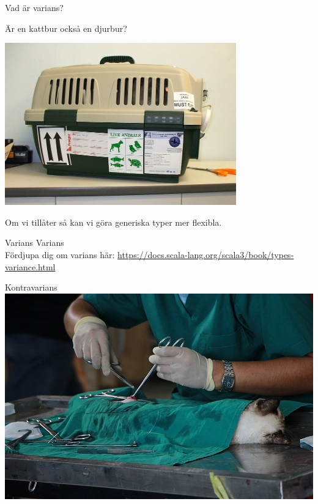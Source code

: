 \begin{Slide}{Vad är varians?}
\begin{center}
Är en kattbur också en djurbur?

\includegraphics[width=0.75\textwidth]{../img/pet-carrier.jpg}  

Om vi tillåter  så kan vi göra generiska typer mer flexibla.
\end{center}
\end{Slide}

\begin{Slide}{Varians}
  \TODO Varians \\ Fördjupa dig om varians här: \url{https://docs.scala-lang.org/scala3/book/types-variance.html}
\end{Slide}


\ifkompendium\else
\begin{SlideSimple}{Kontravarians}
\hspace*{-1cm}\includegraphics[width=1.2\textwidth]{../img/cat-vet.jpg}  
\end{SlideSimple}
\fi 

